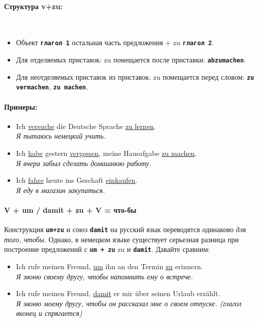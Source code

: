 \documentclass[12pt,a4paper]{report}
\newcommand{\term}[1]{\texttt{\textbf{#1}}}
\newcommand{\satzew}[1]{\underline{#1}}
\newcommand{\ubersatze}[1]{\textit{#1}}
\begin{document}
\paragraph{Структура v+zu:} ~\\
\begin{itemize}
\item Объект \term{глагол 1} остальная часть предложения + zu \term{глагол 2}.
\item Для отделяемых приставок: zu помещается после приставки: \term{abzumachen}.
\item Для неотделяемых приставок из приставок: zu помещается перед словом: \term{zu vermachen}, \term{zu machen}.
\end{itemize}

\paragraph{Примеры:}
\begin{itemize}
\item Ich \satzew{versuche} die Deutsche Sprache \satzew{zu lernen}.
~\\ \ubersatze{Я пытаюсь немецкий учить.}
\item Ich \satzew{habe} gestern \satzew{vergessen}, meine Hausafgabe \satzew{zu machen}.
~\\ \ubersatze{Я вчера забыл сделать домашнюю работу.}
\item Ich \satzew{fahre} heute ins Geschaft \satzew{einkaufen}.
~\\ \ubersatze{Я еду в магазин закупаться.}
\end{itemize}

\paragraph{V + um / damit + zu + V = что-бы}

Конструкция \term{um+zu} и союз \term{damit} на русский язык переводятся одинаково \ubersatze{для того, чтобы}. Однако, в немецком языке существует серьезная разница при построение предложений с \term{um + zu} zu и \term{damit}. Давайте сравним:

\begin{itemize}
\item Ich rufe meinen Freund, \satzew{um} ihn an den Termin \satzew{zu} erinnern.
~\\ \ubersatze{Я звоню своему другу, чтобы напомнить ему о встрече.}
\item Ich rufe meinen Freund, \satzew{damit} er mir über seinen Urlaub erzählt.
~\\ \ubersatze{Я звоню моему другу, чтобы он рассказал мне о своем отпуске. (глагол вконец и спрягается)}
\end{itemize}
\end{document}

